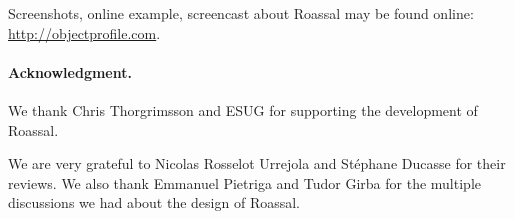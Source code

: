 \documentclass[a4paper,10pt,twoside]{book}
\begin{document}
Screenshots, online example, screencast about Roassal may be found online: \url{http://objectprofile.com}.

\paragraph{Acknowledgment.}
We thank Chris Thorgrimsson and ESUG for supporting the development of Roassal.

We are very grateful to Nicolas Rosselot Urrejola and St\'ephane Ducasse for their reviews. We also thank Emmanuel Pietriga and Tudor Girba for the multiple discussions we had about the design of Roassal. 

%
%


\ifx\wholebook\relax\else
   
   
\end{document}
